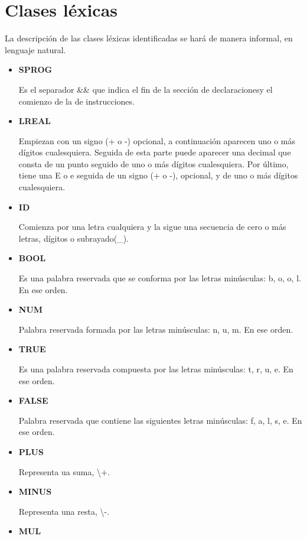 \documentclass[\main/MemoriaPL.tex]{subfiles}
\begin{document}
  \section{Clases léxicas} \label{lexicon}
    \par
    La descripción de las clases léxicas identificadas se hará de manera informal, en lenguaje natural.

    \begin{itemize}
      \item \textbf{SPROG}
        \par
        Es el separador \&\& que indica el fin de la sección de declaracionesy el comienzo de la de instrucciones.
      \item \textbf{LREAL}
        \par
        Empiezan con un signo (+ o -) opcional, a continuación aparecen uno o más dígitos cualesquiera.
        Seguida de esta parte puede aparecer una decimal que consta de un punto seguido de uno o más dígitos cualesquiera.
        Por último, tiene una E o e seguida de un signo (+ o -), opcional, y de uno o más dígitos cualesquiera.
      \item \textbf{ID}
        \par
        Comienza por una letra cualquiera y la sigue una secuencia de cero o más letras, dígitos o subrayado(\_).
      \item \textbf{BOOL}
        \par
        Es una palabra reservada que se conforma por las letras minúsculas: b, o, o, l. En ese orden.
      \item \textbf{NUM}
        \par
        Palabra reservada formada por las letras minúsculas: n, u, m. En ese orden.
      \item \textbf{TRUE}
        \par
        Es una palabra reservada compuesta por las letras minúsculas: t, r, u, e. En ese orden.
      \item \textbf{FALSE}
        \par
        Palabra reservada que contiene las siguientes letras minúsculas: f, a, l, s, e. En ese orden.
      \item \textbf{PLUS}
        \par
        Representa ua suma, \textbackslash +.
      \item \textbf{MINUS}
        \par
        Representa una resta, \textbackslash -.
      \item \textbf{MUL}

\end{itemize}
\end{document}

